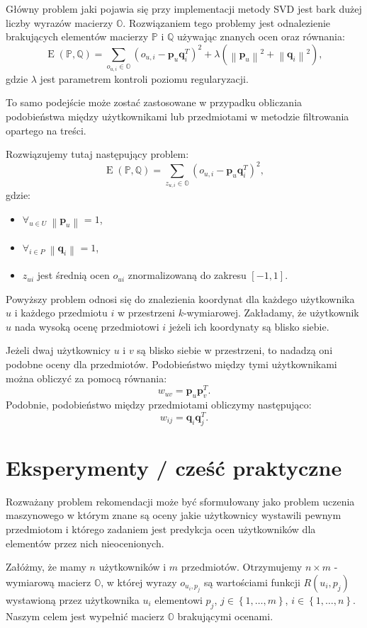 \documentclass[12pt,a4paper]{report}
\newcommand{\set}[1]{\left\lbrace {#1} \right\rbrace}
\newcommand{\norm}[2][]{\left\| {#2} \right\|_{#1}}
\newcommand{\e}[1]{\operatorname{E}\left({#1} \right)}
\begin{document}
Główny problem jaki pojawia się przy implementacji metody SVD jest bark dużej liczby wyrazów macierzy $\mathbb{O}$. 
Rozwiązaniem tego problemy jest odnalezienie brakujących elementów macierzy $\mathbb{P}$ i $\mathbb{Q}$ używając znanych ocen oraz równania:
$$
\e{\mathbb{P}, \mathbb{Q}} = \sum_{o_{u,i} \in \mathbb{O}}(o_{u,i} - \mathbf{p}_u\mathbf{q}_i^T)^2 + \lambda(\norm{\mathbf{p}_u}^2 + \norm{\mathbf{q}_i}^2),
$$
gdzie $\lambda$ jest parametrem kontroli poziomu regularyzacji.

To samo podejście może zostać zastosowane w przypadku obliczania podobieństwa między użytkownikami lub przedmiotami w metodzie filtrowania opartego na treści.

Rozwiązujemy tutaj następujący problem:
$$
\e{\mathbb{P}, \mathbb{Q}} = \sum_{z_{u,i} \in \mathbb{O}}(o_{u,i} - \mathbf{p}_u\mathbf{q}_i^T)^2,
$$
gdzie:
\begin{itemize}
\item $\forall_{u \in \mathit{U}} \: \norm{\mathbf{p}_u} = 1$,
\item $\forall_{i \in \mathit{P}} \: \norm{\mathbf{q}_i} = 1$,
\item $z_{ui}$ jest średnią ocen $o_{ui}$ znormalizowaną do zakresu $[-1,1]$.
\end{itemize}

Powyższy problem odnosi się do znalezienia koordynat dla każdego użytkownika $u$ i każdego przedmiotu $i$ w przestrzeni $k$-wymiarowej. Zakładamy, że użytkownik $u$ nada wysoką ocenę przedmiotowi $i$ jeżeli ich koordynaty są blisko siebie. 

Jeżeli dwaj użytkownicy $u$ i $v$ są blisko siebie w przestrzeni, to  nadadzą oni podobne oceny dla przedmiotów. Podobieństwo między tymi użytkownikami można obliczyć za pomocą równania:
$$
w_{uv} = \mathbf{p}_u \mathbf{p}_v^T.
$$
Podobnie, podobieństwo między przedmiotami obliczymy następująco:
$$
w_{ij} = \mathbf{q}_i \mathbf{q}_j^T.
$$


\chapter{Eksperymenty / cześć praktyczne}

Rozważany problem rekomendacji może być sformułowany jako problem uczenia maszynowego w którym znane są oceny jakie użytkownicy wystawili pewnym przedmiotom i którego zadaniem jest predykcja ocen użytkowników dla elementów przez nich nieocenionych. 

Załóżmy, że mamy $n$ użytkowników i $m$ przedmiotów. Otrzymujemy $n \times m$ - wymiarową macierz $\mathbb{O}$, w której wyrazy $o_{u_i,p_j}$ są wartościami funkcji $R(u_i,p_j)$ wystawioną przez użytkownika $u_i$ elementowi $p_j$, $j \in \set{1, \ldots, m}$, $i \in \set{1, \ldots, n}$. Naszym celem jest wypełnić macierz $\mathbb{O}$ brakującymi ocenami. 
\end{document}
